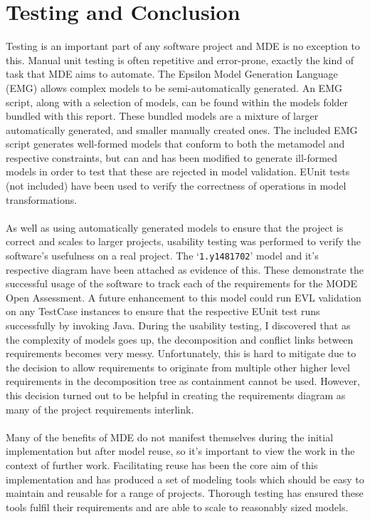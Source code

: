 \documentclass{article}
\begin{document}
\section{Testing and Conclusion}
Testing is an important part of any software project and MDE is no exception to this. Manual unit testing is often repetitive and error-prone, exactly the kind of task that MDE aims to automate. The Epsilon Model Generation Language (EMG)\cite{epsilon_book} allows complex models to be semi-automatically generated. An EMG script, along with a selection of models, can be found within the models folder bundled with this report. These bundled models are a mixture of larger automatically generated, and smaller manually created ones. The included EMG script generates well-formed models that conform to both the metamodel and respective constraints, but can and has been modified to generate ill-formed models in order to test that these are rejected in model validation. EUnit tests (not included) have been used to verify the correctness of operations in model transformations.
\\\\
As well as using automatically generated models to ensure that the project is correct and scales to larger projects, usability testing was performed to verify the software's usefulness on a real project. The `\texttt{1.y1481702}' model and it's respective diagram have been attached as evidence of this. These demonstrate the successful usage of the software to track each of the requirements for the MODE Open Assessment. A future enhancement to this model could run EVL validation on any TestCase instances to ensure that the respective EUnit test runs successfully by invoking Java. During the usability testing, I discovered that as the complexity of models goes up, the decomposition and conflict links between requirements becomes very messy. Unfortunately, this is hard to mitigate due to the decision to allow requirements to originate from multiple other higher level requirements in the decomposition tree as containment cannot be used. However, this decision turned out to be helpful in creating the requirements diagram as many of the project requirements interlink.
\\\\
Many of the benefits of MDE do not manifest themselves during the initial implementation but after model reuse, so it's important to view the work in the context of further work\cite{industry_review}.  Facilitating reuse has been the core aim of this implementation and has produced a set of modeling tools which should be easy to maintain and reusable for a range of projects. Thorough testing has ensured these tools fulfil their requirements and are able to scale to reasonably sized models.
\newpage
\raggedright
{}

\newpage
\end{document}
